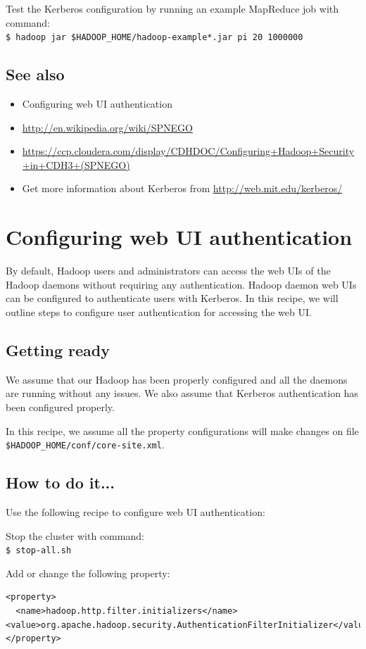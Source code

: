 Test the Kerberos configuration by running an example MapReduce job with command: \\
\verb|$ hadoop jar $HADOOP_HOME/hadoop-example*.jar pi 20 1000000|
\subsection*{See also}
\begin{itemize}
  \item Configuring web UI authentication
  \item \url{http://en.wikipedia.org/wiki/SPNEGO}
  \item \url{https://ccp.cloudera.com/display/CDHDOC/Configuring+Hadoop+Security+in+CDH3+(SPNEGO)}
  \item Get more information about Kerberos from \url{http://web.mit.edu/kerberos/}
\end{itemize}

\section{Configuring web UI authentication}
By default, Hadoop users and administrators can access the web UIs of the Hadoop daemons without requiring any authentication. Hadoop daemon web UIs can be configured to authenticate users with Kerberos. In this recipe, we will outline steps to configure user authentication for accessing the web UI.
\subsection*{Getting ready}
We assume that our Hadoop has been properly configured and all the daemons are running without any issues. We also assume that Kerberos authentication has been configured properly.

In this recipe, we assume all the property configurations will make changes on file \verb|$HADOOP_HOME/conf/core-site.xml|.
\subsection*{How to do it...}
Use the following recipe to configure web UI authentication:

Stop the cluster with command: \\
\verb|$ stop-all.sh|

Add or change the following property:
\lstset{style=bashstyle}
\begin{lstlisting}
<property>
  <name>hadoop.http.filter.initializers</name>
<value>org.apache.hadoop.security.AuthenticationFilterInitializer</value>
</property>
\end{lstlisting}

